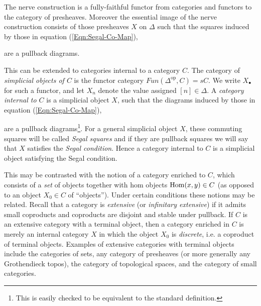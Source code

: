 \documentclass{amsart}
\begin{document}
The nerve construction is a fully-faithful functor from categories and functors to the category of presheaves. Moreover the essential image of the nerve construction consists of those presheaves $X$ on $\Delta$  such that the squares induced by those in equation (\ref{Eqn:Segal-Co-Map}),
\begin{center}
\end{center}
are a pullback diagrams. 

This can be extended to categories internal to a category $C$. The category of {\em simplicial objects of $C$} is the functor category $Fun(\Delta^\textrm{op}, C) = sC$. We write $X_\bullet$ for such a functor, and let $X_n$ denote the value assigned $[n] \in \Delta$. A {\em category internal to $C$} is a simplicial object $X$, such that the diagrams induced by those in equation (\ref{Eqn:Segal-Co-Map}),
\begin{center}
\end{center}
are a pullback diagrams\footnote{This is easily checked to be equivalent to the standard definition.}. For a general simplicial object $X$, these commuting squares will be called {\em Segal squares} and if they are pullback squares we will say that $X$ satisfies the {\em Segal condition}. Hence a category internal to $C$ is a simplicial object satisfying the Segal condition. 

This may be contrasted with the notion of a category enriched to $C$, which consists of a {\em set} of objects together with hom objects $\operatorname{Hom}(x,y) \in C$ (as opposed to an object $X_0 \in C$ of ``objects''). Under certain conditions these notions may be related. Recall that a category is {\em extensive} (or {\em infinitary extensive}) if it admits small coproducts and coproducts are disjoint and stable under pullback. If $C$ is an extensive category with a terminal object, then a category enriched in $C$ is merely an internal category $X$ in which the object $X_0$ is {\em discrete}, i.e. a coproduct of terminal objects. Examples of extensive categories with terminal objects include the categories of sets, any category of presheaves (or more generally any Grothendieck topos), the category of topological spaces, and the category of small categories. 
\end{document}
